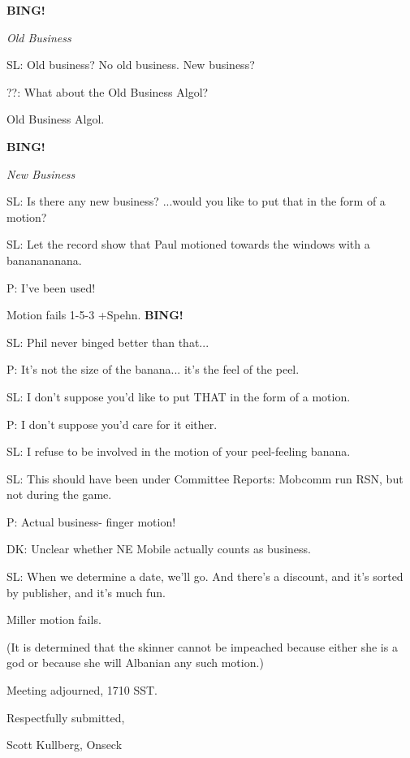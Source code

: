 \documentclass[12pt]{article}
\newcommand{\bing}{{\bf BING!} }
\newcommand{\goto}[1]{\bing \vskip 12pt \centerline{{\em{#1}}}}
\begin{document}
\goto{Old Business}

SL: Old business? No old business. New business?

??: What about the Old Business Algol?

Old Business Algol.

\goto{New Business}

SL: Is there any new business? ...would you like to put that in the form of a motion?

SL: Let the record show that Paul motioned towards the windows with a bananananana.

P: I've been used!

Motion fails 1-5-3 +Spehn. \bing

SL: Phil never binged better than that...

P: It's not the size of the banana... it's the feel of the peel.

SL: I don't suppose you'd like to put THAT in the form of a motion.

P: I don't suppose you'd care for it either.

SL: I refuse to be involved in the motion of your peel-feeling banana.

SL: This should have been under Committee Reports: Mobcomm run RSN, but not during the game.

P: Actual business- finger motion!

DK: Unclear whether NE Mobile actually counts as business.

SL: When we determine a date, we'll go. And there's a discount, and it's sorted by publisher, and it's much fun.

Miller motion fails.

(It is determined that the skinner cannot be impeached because either she is a god or because she will Albanian any such motion.)

\vspace{12pt}

\noindent
Meeting adjourned, 1710 SST.

\vspace{18pt}

\centerline{Respectfully submitted,}
\centerline{Scott Kullberg, Onseck}
\end{document}

